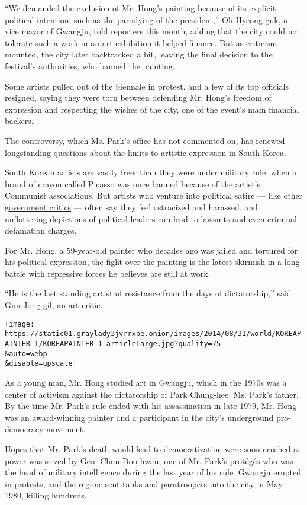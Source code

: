 ``We demanded the exclusion of Mr. Hong's painting because of its
explicit political intention, such as the parodying of the president,''
Oh Hyeong-guk, a vice mayor of Gwangju, told reporters this month,
adding that the city could not tolerate such a work in an art exhibition
it helped finance. But as criticism mounted, the city later backtracked
a bit, leaving the final decision to the festival's authorities, who
banned the painting.

Some artists pulled out of the biennale in protest, and a few of its top
officials resigned, saying they were torn between defending Mr. Hong's
freedom of expression and respecting the wishes of the city, one of the
event's main financial backers.

The controversy, which Ms. Park's office has not commented on, has
renewed longstanding questions about the limits to artistic expression
in South Korea.

South Korean artists are vastly freer than they were under military
rule, when a brand of crayon called Picasso was once banned because of
the artist's Communist associations. But artists who venture into
political satire --- like other
\href{http://www.nytimes3xbfgragh.onion/2012/08/13/world/asia/critics-see-south-korea-internet-curbs-as-censorship.html}{government
critics} --- often say they feel ostracized and harassed, and
unflattering depictions of political leaders can lead to lawsuits and
even criminal defamation charges.

For Mr. Hong, a 59-year-old painter who decades ago was jailed and
tortured for his political expression, the fight over the painting is
the latest skirmish in a long battle with repressive forces he believes
are still at work.

``He is the last standing artist of resistance from the days of
dictatorship,'' said Gim Jong-gil, an art critic.

\texttt{[image: https://static01.graylady3jvrrxbe.onion/images/2014/08/31/world/KOREAPAINTER-1/KOREAPAINTER-1-articleLarge.jpg?quality=75\\\&auto=webp\\\&disable=upscale]}

As a young man, Mr. Hong studied art in Gwangju, which in the 1970s was
a center of activism against the dictatorship of Park Chung-hee, Ms.
Park's father. By the time Mr. Park's rule ended with his assassination
in late 1979, Mr. Hong was an award-winning painter and a participant in
the city's underground pro-democracy movement.

Hopes that Mr. Park's death would lead to democratization were soon
crushed as power was seized by Gen. Chun Doo-hwan, one of Mr. Park's
protégés who was the head of military intelligence during the last year
of his rule. Gwangju erupted in protests, and the regime sent tanks and
paratroopers into the city in May 1980, killing hundreds.

